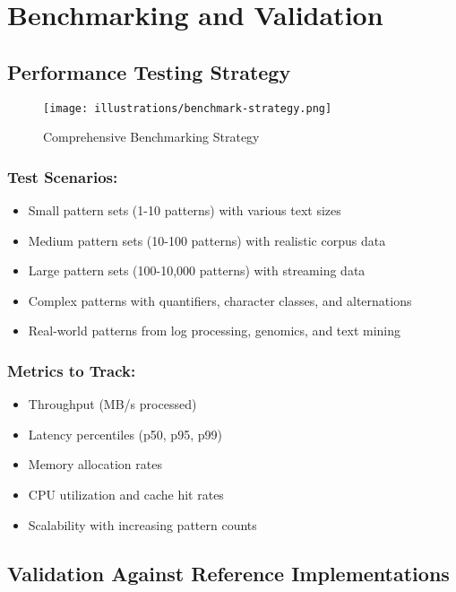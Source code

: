 \documentclass[11pt,a4paper]{article}
\begin{document}
\section{Benchmarking and Validation}

\subsection{Performance Testing Strategy}

\begin{figure}[htbp]
\centering
\texttt{[image: illustrations/benchmark-strategy.png]}
\caption{Comprehensive Benchmarking Strategy}
\label{fig:benchmark}
\end{figure}

\subsubsection{Test Scenarios:}
\begin{itemize}
\item Small pattern sets (1-10 patterns) with various text sizes
\item Medium pattern sets (10-100 patterns) with realistic corpus data  
\item Large pattern sets (100-10,000 patterns) with streaming data
\item Complex patterns with quantifiers, character classes, and alternations
\item Real-world patterns from log processing, genomics, and text mining
\end{itemize}

\subsubsection{Metrics to Track:}
\begin{itemize}
\item Throughput (MB/s processed)
\item Latency percentiles (p50, p95, p99)
\item Memory allocation rates
\item CPU utilization and cache hit rates
\item Scalability with increasing pattern counts
\end{itemize}

\subsection{Validation Against Reference Implementations}
\end{document}
